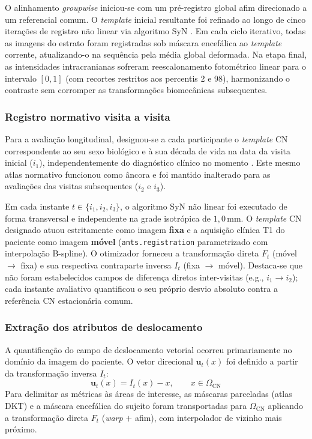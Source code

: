 \documentclass[review]{elsarticle}
\newcommand{\code}[1]{\texttt{#1}}
\begin{document}
O alinhamento \emph{groupwise} iniciou-se com um pré-registro global afim direcionado a um referencial comum. O \emph{template} inicial resultante foi refinado ao longo de cinco iterações de registro não linear via algoritmo SyN \cite{avants-2014}. Em cada ciclo iterativo, todas as imagens do estrato foram registradas sob máscara encefálica ao \emph{template} corrente, atualizando-o na sequência pela média global deformada. Na etapa final, as intensidades intracranianas sofreram reescalonamento fotométrico linear para o intervalo $[0,1]$ (com recortes restritos aos percentis 2 e 98), harmonizando o contraste sem corromper as transformações biomecânicas subsequentes.

\subsubsection{Registro normativo visita a visita}\label{subsec:deslocamento_longitudinal}
Para a avaliação longitudinal, designou-se a cada participante o \emph{template} CN correspondente ao seu sexo biológico e à sua década de vida na data da visita inicial ($i_1$), independentemente do diagnóstico clínico no momento \cite{wyman-2013}. Este mesmo atlas normativo funcionou como âncora e foi mantido inalterado para as avaliações das visitas subsequentes ($i_2$ e $i_3$).

Em cada instante $t \in \{i_1, i_2, i_3\}$, o algoritmo SyN não linear \cite{avants-2011a} foi executado de forma transversal e independente na grade isotrópica de $1{,}0$\,mm. O \emph{template} CN designado atuou estritamente como imagem \textbf{fixa} e a aquisição clínica T1 do paciente como imagem \textbf{móvel} (\code{ants.registration} parametrizado com interpolação B-spline). O otimizador forneceu a transformação direta $F_t$ (móvel $\to$ fixa) e sua respectiva contraparte inversa $I_t$ (fixa $\to$ móvel). Destaca-se que não foram estabelecidos campos de diferença diretos inter-visitas (e.g., $i_1 \to i_2$); cada instante avaliativo quantificou o seu próprio desvio absoluto contra a referência CN estacionária comum.

\subsubsection{Extração dos atributos de deslocamento}\label{sec:displacement-features}
A quantificação do campo de deslocamento vetorial ocorreu primariamente no domínio da imagem do paciente. O vetor direcional $\mathbf{u}_t(x)$ foi definido a partir da transformação inversa $I_t$:
$$ \mathbf{u}_t(x) = I_t(x) - x, \qquad x \in \Omega_{\mathrm{CN}} $$
Para delimitar as métricas às áreas de interesse, as máscaras parceladas (atlas DKT) e a máscara encefálica do sujeito foram transportadas para $\Omega_{\mathrm{CN}}$ aplicando a transformação direta $F_t$ (\emph{warp} $+$ afim), com interpolador de vizinho mais próximo.
\end{document}
